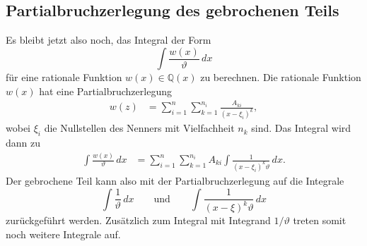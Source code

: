 %
%
\subsection{Partialbruchzerlegung des gebrochenen Teils}
Es bleibt jetzt also noch, das Integral der Form
\[
\int \frac{w(x)}{\vartheta}\,dx
\]
für eine rationale Funktion $w(x)\in\mathbb{Q}(x)$ zu berechnen.
Die rationale Funktion $w(x)$ hat eine Partialbruchzerlegung
\begin{align*}
w(z)
&=
\sum_{i=1}^n \sum_{k=1}^{n_i}\frac{A_{ki}}{(x-\xi_i)^k},
\end{align*}
wobei $\xi_i$ die Nullstellen des Nenners mit Vielfachheit $n_k$ sind.
Das Integral wird dann zu
\begin{align*}
\int \frac{w(x)}{\vartheta}\,dx
&=
\sum_{i=1}^n \sum_{k=1}^{n_i}
A_{ki}
\int
\frac{1}{(x-\xi_i)^k\vartheta}\,dx.
\end{align*}
Der gebrochene Teil kann also mit der Partialbruchzerlegung auf die
Integrale 
\begin{equation}
\int\frac{1}{\vartheta}\,dx
\qquad\text{und}\qquad
\int\frac{1}{(x-\xi)^k\vartheta}\,dx
\label{buch:intalg:wurzel:eqn:grundintegrale}
\end{equation}
zurückgeführt werden.
Zusätzlich zum Integral mit Integrand $1/\vartheta$ treten somit noch
weitere Integrale auf.
